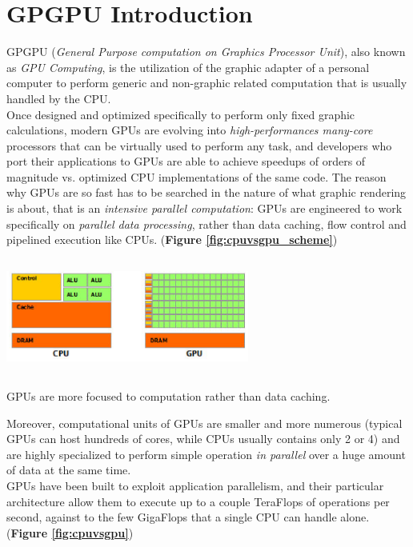\section{GPGPU Introduction}

GPGPU (\textit{General Purpose computation on Graphics Processor Unit}), also known as \textit{GPU Computing}, is the utilization of the graphic adapter of a personal computer to perform generic and non-graphic related computation that is usually handled by the CPU.\\
Once designed and optimized specifically to perform only fixed graphic calculations, modern GPUs are evolving into \emph{high-performances many-core} processors that can be virtually used to perform any task, and developers who port their applications to GPUs are able to achieve speedups of orders of magnitude vs. optimized CPU implementations of the same code.\cite{GPGPUORG:About}
The reason why GPUs are so fast has to be searched in the nature of what graphic rendering is about, that is an \emph{intensive parallel computation}: GPUs are engineered to work specifically on \emph{parallel data processing}, rather than data caching, flow control and pipelined execution like CPUs. (\textbf{Figure \ref{fig:cpuvsgpu_scheme}})

\begin{figurehere}
 \centering
 \includegraphics[width=8cm, height=3.8cm]{./eps/GPU_CPU_struct.eps}
 \caption{GPUs are more focused to computation rather than data caching.}
 \label{fig:cpuvsgpu_scheme}
\end{figurehere}

Moreover, computational units of GPUs are smaller and more numerous (typical GPUs can host hundreds of cores, while CPUs usually contains only 2 or 4) and are highly specialized to perform simple operation \emph{in parallel} over a huge amount of data at the same time.\\
GPUs have been built to exploit application parallelism, and their particular architecture allow them to execute up to a couple TeraFlops of operations per second, against to the few GigaFlops that a single CPU can handle alone. (\textbf{Figure \ref{fig:cpuvsgpu}})

